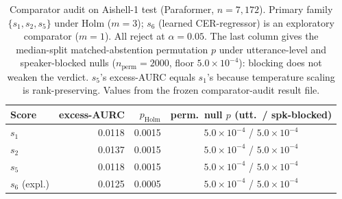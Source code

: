 \documentclass[11pt]{article}
\begin{document}
\begin{table}[t]
  \centering
  \caption{Comparator audit on Aishell-1 test (Paraformer, $n=7{,}172$). Primary family
  $\{s_1,s_2,s_5\}$ under Holm ($m=3$); $s_6$ (learned CER-regressor) is an exploratory
  comparator ($m=1$). All reject at $\alpha=0.05$. The last column gives the median-split
  matched-abstention permutation $p$ under utterance-level and speaker-blocked nulls
  ($n_{\mathrm{perm}}=2000$, floor $5.0\times10^{-4}$): blocking does not weaken the verdict.
  $s_5$'s excess-AURC equals $s_1$'s because temperature scaling is rank-preserving. Values
  from the frozen comparator-audit result file.}
  \label{tab:comparator}
  \begin{tabular}{lrrc}
    \toprule
    Score & excess-AURC & $p_{\mathrm{Holm}}$ & perm.\ null $p$ (utt.\ / spk-blocked) \\
    \midrule
    $s_1$         & 0.0118 & 0.0015 & $5.0\times10^{-4}$ / $5.0\times10^{-4}$ \\
    $s_2$         & 0.0137 & 0.0015 & $5.0\times10^{-4}$ / $5.0\times10^{-4}$ \\
    $s_5$         & 0.0118 & 0.0015 & $5.0\times10^{-4}$ / $5.0\times10^{-4}$ \\
    $s_6$ (expl.) & 0.0125 & 0.0005 & $5.0\times10^{-4}$ / $5.0\times10^{-4}$ \\
    \bottomrule
  \end{tabular}
\end{table}
\end{document}
